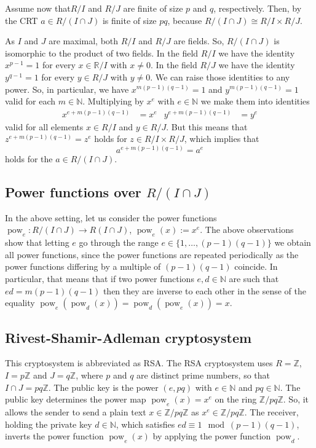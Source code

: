 \documentclass[11pt,a4paper]{amsart}
\newcommand{\Z}{{\mathbb{Z}}}
\newcommand{\R}{{\mathbb{R}}}
\newcommand{\N}{{\mathbb{N}}}
\newcommand{\pow}{\operatorname{pow}}
\begin{document}
Assume now that$ R / I$ and $R/ J$ are finite of size $p$ and $q$, respectively. Then, by the CRT $a \in R / (I \cap J)$ is finite of size $pq$, because $R / (I \cap J) \cong R / I \times R / J$. 

As $I$ and $J$ are maximal, both $R / I$ and $R/ J$ are fields. So, $R / (I \cap J)$ is isomorphic to the product of two fields. In the field $R / I$ we have the identity $x^{p-1} =1$ for every $x \in \R / I$ with $x \ne 0$. In the field $R /J$ we have the identity $y^{q-1} = 1$ for every $y \in R / J$ with $y \ne 0$. We can raise those identities to any power. So, in particular, we have $x^{m (p-1)(q-1)} = 1$ and $y^{m (p-1)(q-1)} =1$ valid for each $m \in \N$. Multiplying by $x^e$ with $e \in \N$  we make them into identities 
\begin{align*} 
	x^{e + m (p-1) (q-1)} & = x^e &  y^{e+ m (p-1) (q-1)} & = y^e
\end{align*} 
valid for all elements $x \in R/I$ and $y \in R/J$. 
But this means that $z^{e+ m (p-1) (q-1)} = z^e$ holds for $z \in R / I \times R / J$, which implies that 
\[
	a^{e + m (p-1)(q-1)} = a^e
\] holds for the $a \in R / (I \cap J)$. 

\subsection{Power functions over $R /( I \cap J)$} In the above setting, let us consider the power functions $\pow_e : R / (I \cap J) \to R  (I \cap J)$, $\pow_e(x):= x^e$. The above observations show that letting $e$ go through the range $e \in \{1,\ldots,(p-1)(q-1) \}$ we obtain all power functions, since the power functions are repeated periodically as the power functions differing by a multiple of $(p-1)(q-1)$ coincide. 
In particular, that means that if two power functions $e,d \in \N$ are such that $e d = m (p-1) (q-1)$ then they are inverse to each other in the sense of the equality $\pow_e(\pow_d(x))=\pow_d(\pow_e(x))=x$. 


\subsection{Rivest-Shamir-Adleman cryptosystem} This cryptosystem is abbreviated as RSA. The RSA cryptosystem uses $ R = \Z$, $I = p \Z$ and $J = q \Z$, where $p$ and $q$ are distinct prime numbers, so that $I \cap J = p q \Z$. The public key is the power $(e, p q )$ with $e \in \N$ and $pq \in \N$. The public key determines the power map $\pow_e(x) = x^e$ on the ring $ \Z / p q \Z$. 
So, it  allows the sender to send a plain text $x \in \Z / p q \Z$ as $x^e \in \Z / pq \Z$. The receiver, holding the private key  $d \in \N$, which satisfies $e d \equiv 1 \mod (p-1)(q-1)$, inverts the power function $\pow_e(x)$  by applying the power function $\pow_d$. 
\end{document}

